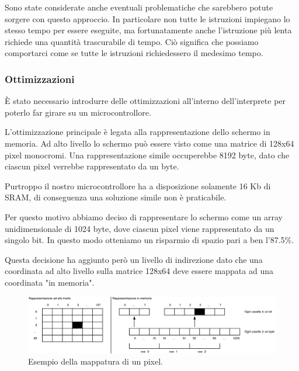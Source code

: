 \documentclass[a4paper]{article}
\begin{document}
Sono state considerate anche eventuali problematiche che sarebbero potute sorgere con questo
approccio. In particolare non tutte le istruzioni impiegano lo stesso tempo per essere eseguite,
ma fortunatamente anche l'istruzione più lenta richiede una quantità trascurabile di tempo.
Ciò significa che possiamo comportarci come se tutte le istruzioni richiedessero il medesimo tempo.

\subsubsection{Ottimizzazioni}


È stato necessario introdurre delle ottimizzazioni all'interno
dell'interprete per poterlo far girare su un microcontrollore.

L'ottimizzazione principale è legata alla rappresentazione dello
schermo in memoria. Ad alto livello lo schermo può essere visto
come una matrice di 128x64 pixel monocromi. Una rappresentazione
simile occuperebbe 8192 byte, dato che ciascun pixel verrebbe
rappresentato da un byte.

Purtroppo il nostro microcontrollore ha a disposizione solamente 16 Kb di SRAM, di conseguenza
una soluzione simile non è praticabile.

Per questo motivo abbiamo deciso di rappresentare lo schermo come un array unidimensionale di
1024 byte, dove ciascun pixel viene rappresentato da un singolo bit. In questo modo otteniamo
un risparmio di spazio pari a ben l'87.5\%.

Questa decisione ha aggiunto però un livello di indirezione dato
che una coordinata ad alto livello sulla matrice 128x64 deve essere
mappata ad una coordinata "in memoria".

\begin{figure}[h!t]
    \begin{center}
        \includegraphics[scale=0.38]{figures/screenopt_small.pdf}
    \end{center}
    \caption{Esempio della mappatura di un pixel.}
    \label{fig:screenopt}
\end{figure}
\end{document}
